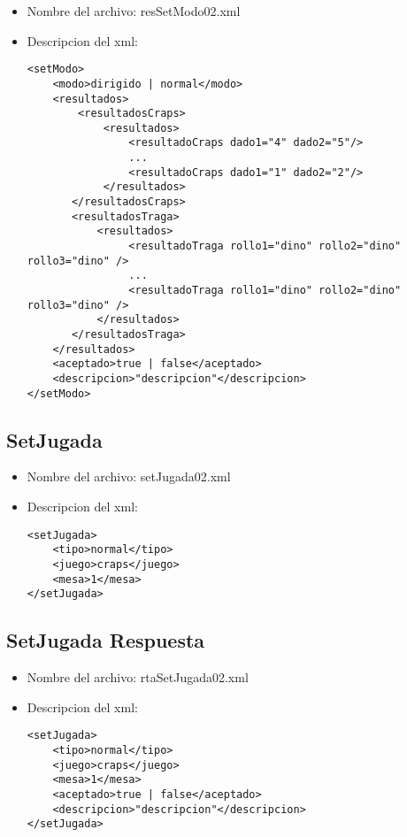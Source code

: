 \begin{itemize}
	\item Nombre del archivo: resSetModo02.xml
	\item Descripcion del xml:
		\begin{verbatim}
<setModo>
    <modo>dirigido | normal</modo>
    <resultados>
        <resultadosCraps>
            <resultados>
                <resultadoCraps dado1="4" dado2="5"/>
                ...
                <resultadoCraps dado1="1" dado2="2"/>
            </resultados>
       </resultadosCraps>
       <resultadosTraga>
           <resultados>
                <resultadoTraga rollo1="dino" rollo2="dino" rollo3="dino" />
                ...
                <resultadoTraga rollo1="dino" rollo2="dino" rollo3="dino" />
           </resultados>
       </resultadosTraga>
    </resultados>
    <aceptado>true | false</aceptado>
    <descripcion>"descripcion"</descripcion>
</setModo>
\end{verbatim}
\end{itemize}


\subsection{SetJugada}
\label{sec:SetJugada}

\begin{itemize}
	\item Nombre del archivo: setJugada02.xml
	\item Descripcion del xml:
		\begin{verbatim}
<setJugada>
    <tipo>normal</tipo>
    <juego>craps</juego>
    <mesa>1</mesa>
</setJugada>
\end{verbatim}
\end{itemize}

\subsection{SetJugada Respuesta}
\label{sec:SetJugadaRespuesta}

\begin{itemize}
	\item Nombre del archivo: rtaSetJugada02.xml
	\item Descripcion del xml:
		\begin{verbatim}
<setJugada>
    <tipo>normal</tipo>
    <juego>craps</juego>
    <mesa>1</mesa>
    <aceptado>true | false</aceptado>			
    <descripcion>"descripcion"</descripcion>
</setJugada>
\end{verbatim}
\end{itemize}



